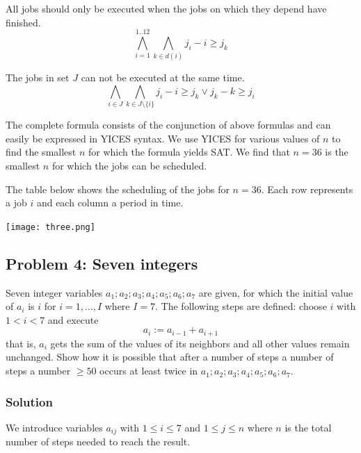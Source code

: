 \documentclass[12pt]{article}
\begin{document}
\vspace{3mm}

All jobs should only be executed when the jobs on which they depend have
finished.
\begin{equation}
	\bigwedge_{i=1}^{1..12} \bigwedge_{k \in d(i)} j_i - i \geq j_k
\end{equation}

\vspace{3mm}

The jobs in set $J$ can not be executed at the same time.
\begin{equation}
	\bigwedge_{i \in J} \bigwedge_{k \in J\setminus\{i\}} 
		j_i - i \geq j_k \vee j_k -k \geq j_i
\end{equation}

\vspace{3mm}

The complete formula consists of the conjunction of above formulas and can 
easily be expressed in YICES syntax. We use YICES for various values of $n$
to find the smallest $n$ for which the formula yields SAT. We find that
$n = 36$ is the smallest $n$ for which the jobs can be scheduled. 

The table below shows the scheduling of the jobs for $n = 36$. Each row 
represents a job $i$ and each column a period in time.  

\texttt{[image: three.png]}


\subsection*{Problem 4: Seven integers}

Seven integer variables $a_1; a_2; a_3; a_4; a_5; a_6; a_7$ are given, for
which the initial value of $a_i$ is $i$ for $i=1,\ldots,I$ where $I=7$. The
following steps are defined: choose $i$ with $1<i<7$ and execute
$$a_i:=a_{i-1}+a_{i+1}$$
that is, $a_i$ gets the sum of the values of its
neighbors and all other values remain unchanged. Show how it is possible that
after a number of steps a number of steps a number $\geq 50$ occurs at least
twice in $a_1; a_2; a_3; a_4; a_5; a_6; a_7$.

\subsubsection*{Solution}
We introduce variables $a_{ij}$ with $1\leq i \leq 7$ and $1 \leq j \leq n$ 
where $n$ is the total number of steps needed to reach the result.
\end{document}
